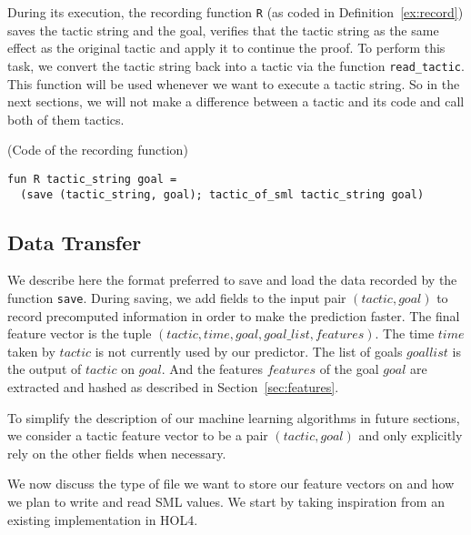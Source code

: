 \documentclass[runningheads,a4paper,draft]{svjour3}
\def\holfour{\textsf{HOL4}\xspace}
\def\sml{\textsf{SML}\xspace}
\begin{document}
During its execution, the recording function \texttt{R} (as coded in 
Definition~\ref{ex:record}) 
saves the tactic 
string and the goal, verifies that the tactic string as the same effect as the 
original tactic and apply it to continue the proof. To perform this task, we 
convert the tactic string back into a tactic via the function 
\texttt{read\_tactic}. This function will be used whenever we want to execute a 
tactic string. So in the next sections, we will not make a difference between a 
tactic and its code and call both of them tactics.


\begin{example}\label{ex:record} (Code of the recording function)
\begin{lstlisting}[language=SMLSmall,frame=tb]
fun R tactic_string goal = 
  (save (tactic_string, goal); tactic_of_sml tactic_string goal)
\end{lstlisting}
\end{example} 

\subsection{Data Transfer}
We describe here the format preferred to save and load the 
data recorded by the function \texttt{save}. 
During saving, we add fields to the input pair $(tactic,goal)$ to record 
precomputed information in order to make the prediction faster. The final 
feature vector is the tuple $(tactic,time,goal,goal\_list,features)$.
The time $time$ taken by $tactic$ is not currently used by our 
predictor. The list of goals $goal list$ is the output of $tactic$ on 
$goal$. And the features $features$ of the goal $goal$ are extracted and hashed 
as described in Section~\ref{sec:features}. 

\begin{remark}
To simplify the description of our machine learning algorithms in future 
sections, we consider a tactic feature vector to be a pair $(tactic,goal)$ and 
only 
explicitly rely on the 
other fields when necessary.
\end{remark}

We now discuss the type of file we want to store our feature vectors on and
how we plan to write and read \sml values. We start by taking 
inspiration from an existing implementation in \holfour.
\end{document}
